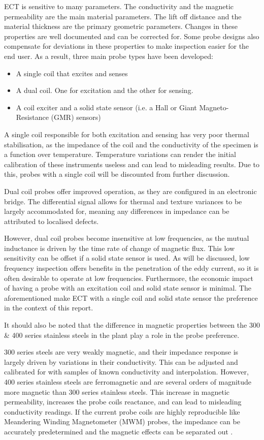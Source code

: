 \documentclass[a4paper,twoside,11pt]{article}
\begin{document}
ECT is sensitive to many parameters. The conductivity and the magnetic permeability are the main material parameters. 
The lift off distance and the material thickness are the primary geometric parameters.
Changes in these properties are well documented and can be corrected for. Some probe designs also compensate for deviations in these properties to make inspection easier for the end user. As a result, three main probe types have been developed:
\begin{itemize}
	\item A single coil that excites and senses
	\item A dual coil. One for excitation and the other for sensing.
	\item A coil exciter and a solid state sensor (i.e. a Hall or Giant Magneto-Resistance (GMR) sensors)
\end{itemize}

A single coil responsible for both excitation and sensing has very poor thermal stabilisation, as the impedance of the coil and the conductivity of the specimen is a function over temperature. 
Temperature variations can render the initial calibration of these instruments useless and can lead to misleading results. 
Due to this, probes with a single coil will be discounted from further discussion.

Dual coil probes offer improved operation, as they are configured in an electronic bridge. 
The differential signal allows for thermal and texture variances to be largely accommodated for, meaning any differences in impedance can be attributed to localised defects. 

However, dual coil probes become insensitive at low frequencies, as the mutual inductance is driven by the time rate of change of magnetic flux. 
This low sensitivity can be offset if a solid state sensor is used. 
As will be discussed, low frequency inspection offers benefits in the penetration of the eddy current, so it is often desirable to operate at low frequencies. 
Furthermore, the economic impact of having a probe with an excitation coil and solid state sensor is minimal. The aforementioned make ECT with a single coil and solid state sensor the preference in the context of this report.

It should also be noted that the difference in magnetic properties between the 300 \& 400 series stainless steels in the plant play a role in the probe preference. 

300 series steels are very weakly magnetic, and their impedance response is largely driven by variations in their conductivity. 
This can be adjusted and calibrated for with samples of known conductivity and interpolation. 
However, 400 series stainless steels are ferromagnetic and are several orders of magnitude more magnetic than 300 series stainless steels.
This increase in magnetic permeability, increases the probe coils reactance, and can lead to misleading conductivity readings. 
If the current probe coils are highly reproducible like Meandering Winding Magnetometer (MWM) probes, the impedance can be accurately predetermined and the magnetic effects can be separated out \cite{goldfineMagnetometersImprovedMaterials1993}. 
\end{document}
